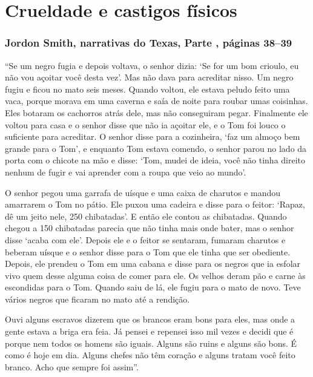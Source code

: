 \chapter{Crueldade e castigos físicos}

\subsection{Jordon Smith, narrativas do Texas, Parte , páginas 38--39}
\label{ref245}

``Se um negro fugia e depois voltava, o senhor dizia: `Se for um bom
crioulo, eu não vou açoitar você desta vez'. Mas não dava para acreditar
nisso. Um negro fugiu e ficou no mato seis meses. Quando voltou, ele
estava peludo feito uma vaca, porque morava em uma caverna e saía de
noite para roubar umas coisinhas. Eles botaram os cachorros atrás dele,
mas não conseguiram pegar. Finalmente ele voltou para casa e o senhor
disse que não ia açoitar ele, e o Tom foi louco o suficiente para
acreditar. O senhor disse para a cozinheira, `faz um almoço bem grande
para o Tom', e enquanto Tom estava comendo, o senhor parou no lado da
porta com o chicote na mão e disse: `Tom, mudei de ideia, você não tinha
direito nenhum de fugir e vai aprender com a roupa que veio ao mundo'.

O senhor pegou uma garrafa de uísque e uma caixa de charutos e mandou
amarrarem o Tom no pátio. Ele puxou uma cadeira e disse para o feitor:
`Rapaz, dê um jeito nele, 250 chibatadas'. E então ele contou as
chibatadas. Quando chegou a 150 chibatadas parecia que não tinha mais
onde bater, mas o senhor disse `acaba com ele'. Depois ele e o feitor se
sentaram, fumaram charutos e beberam uísque e o senhor disse para o Tom
que ele tinha que ser obediente. Depois, ele prendeu o Tom em uma cabana
e disse para os negros que ia esfolar vivo quem desse alguma coisa de
comer para ele. Os velhos deram pão e carne às escondidas para o Tom.
Quando saiu de lá, ele fugiu para o mato de novo. Teve vários negros que
ficaram no mato até a rendição.

Ouvi alguns escravos dizerem que os brancos eram bons para eles, mas
onde a gente estava a briga era feia. Já pensei e repensei isso mil
vezes e decidi que é porque nem todos os homens são iguais. Alguns são
ruins e alguns são bons. É como é hoje em dia. Alguns chefes não têm
coração e alguns tratam você feito branco. Acho que sempre foi assim''.

